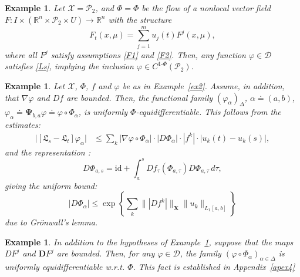 \documentclass[sn-mathphys-num]{sn-jnl}
\numberwithin{equation}{section}
\theoremstyle{mythm}
\theoremstyle{mydef}
\newtheorem{example}[proposition]{Example}
\renewcommand{\phi}{\varphi}
\renewcommand{\d}{\,d}
\newcommand{\id}{\mathrm{id}}
\begin{document}
\begin{example}\label{ex0}
Let $\mathcal X = \mathcal P_2$, and $\Phi = \Phi$ be the flow of a nonlocal vector field \( F \colon I \times (\mathbb{R}^n \times \mathcal{P}_2 \times U) \to \mathbb{R}^n \) with the structure 
\[F_t(x, \mu) = \sum_{j=1}^m u_j(t) F^j(x, \mu),
\] where all $F^j$ satisfy assumptions \ref{F1} and \ref{F2}. Then, any function $\phi \in \bm{\mathcal D}$ satisfies \eqref{Ls}, implying the inclusion $\phi \in C^{1\text{-}\Phi}(\mathcal P_2)$. 
\end{example}

\begin{example}\label{ex_5} Let $\mathcal X$, $\Phi$, $f$ and $\phi$ be as in Example~\ref{ex2}. Assume, in addition, that $\nabla \phi$ and $D f$ are bounded. Then, the functional family $(\phi_\alpha)_\Delta$,  $\alpha \doteq (a, b)$,  
$\phi_\alpha \doteq \bm \Psi_{b,a} \phi \doteq \phi\circ \Phi_\alpha$, is uniformly $\Phi$-equidifferentiable. This follows from the estimates:  
\begin{align*}
    \big|[\mathfrak{L}_s-\mathfrak L_t] \phi_\alpha\big| & \leq \sum_k\left|\nabla \phi\circ \Phi_{\alpha}\right|\cdot |D \Phi_{\alpha}|\cdot \left|f^k\right|\cdot \big|u_k(t) - u_k(s)\big|,
\end{align*}
and the representation \cite[Theorems~2.3.2, 2.2.3]{ABressan_BPiccoli_2007a}:
\[
    D\Phi_{a,s} = \id + \displaystyle\int_a^s D f_{\tau}(\Phi_{a,\tau})D\Phi_{a,\tau}   \d \tau,
\]
giving the uniform bound:
\[
|D\Phi_\alpha| \leq  \exp\left\{\sum_k\||D f^k|\|_{\bm X}\|u_k\|_{L_1[a,b]}\right\}
\]
due to Gr\"{o}nwall's lemma.

\end{example}


\begin{example}\label{ex:6}
   In addition to the hypotheses of Example~\ref{ex0}, suppose that the maps $DF^j$ and $\bm D F^j$ are bounded. Then, for any $\phi \in \bm{\mathcal D}$, the family $(\phi \circ \Phi_{\alpha})_{\alpha \in \Delta}$ is uniformly equidifferentiable w.r.t. $\Phi$. This fact is established in Appendix~\ref{apex4}
\end{example}
\end{document}
